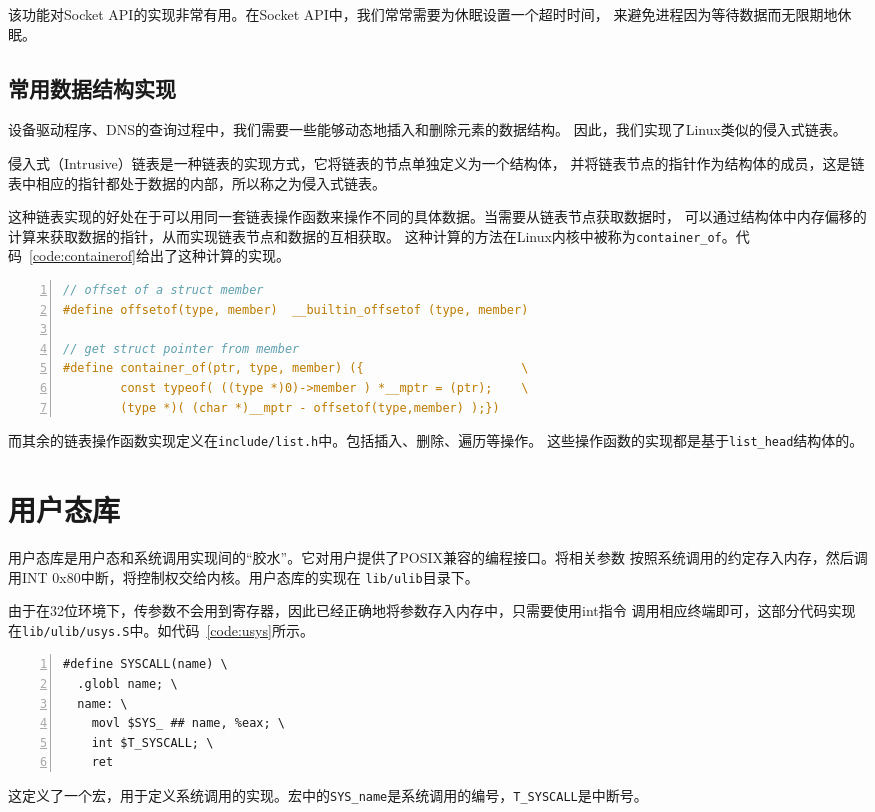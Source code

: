 \documentclass[a4paper,twoside]{ctexrep}
\begin{document}
\begin{spacing}{1.2}
该功能对Socket API的实现非常有用。在Socket API中，我们常常需要为休眠设置一个超时时间，
来避免进程因为等待数据而无限期地休眠。


\subsection{常用数据结构实现}

设备驱动程序、DNS的查询过程中，我们需要一些能够动态地插入和删除元素的数据结构。
因此，我们实现了Linux类似的侵入式链表。

侵入式（Intrusive）链表是一种链表的实现方式，它将链表的节点单独定义为一个结构体，
并将链表节点的指针作为结构体的成员，这是链表中相应的指针都处于数据的内部，所以称之为侵入式链表。

这种链表实现的好处在于可以用同一套链表操作函数来操作不同的具体数据。当需要从链表节点获取数据时，
可以通过结构体中内存偏移的计算来获取数据的指针，从而实现链表节点和数据的互相获取。
这种计算的方法在Linux内核中被称为\texttt{container\_of}。代码~\ref{code:containerof}给出了这种计算的实现。

\begin{lstlisting}[numbers=left,style=CppStyle,caption={container\_of宏的实现},label={code:containerof},language=C]
// offset of a struct member
#define offsetof(type, member)  __builtin_offsetof (type, member)

// get struct pointer from member
#define container_of(ptr, type, member) ({                      \
        const typeof( ((type *)0)->member ) *__mptr = (ptr);    \
        (type *)( (char *)__mptr - offsetof(type,member) );})
\end{lstlisting}

而其余的链表操作函数实现定义在\texttt{include/list.h}中。包括插入、删除、遍历等操作。
这些操作函数的实现都是基于\texttt{list\_head}结构体的。

\section{用户态库}

用户态库是用户态和系统调用实现间的“胶水”。它对用户提供了POSIX兼容的编程接口。将相关参数
按照系统调用的约定存入内存，然后调用INT 0x80中断，将控制权交给内核。用户态库的实现在
\texttt{lib/ulib}目录下。

由于在32位环境下，传参数不会用到寄存器，因此已经正确地将参数存入内存中，只需要使用int指令
调用相应终端即可，这部分代码实现在\texttt{lib/ulib/usys.S}中。如代码~\ref{code:usys}所示。
\begin{lstlisting}[numbers=left,style=CppStyle,caption={usys.S中的系统调用实现},label={code:usys}]
#define SYSCALL(name) \
  .globl name; \
  name: \
    movl $SYS_ ## name, %eax; \
    int $T_SYSCALL; \
    ret
\end{lstlisting}
这定义了一个宏，用于定义系统调用的实现。宏中的\texttt{SYS\_name}是系统调用的编号，\texttt{T\_SYSCALL}是中断号。


\end{spacing}
\end{document}
